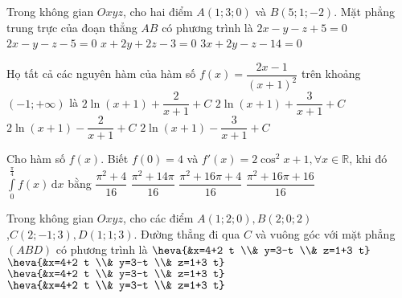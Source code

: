\begin{ex}%
Trong không gian $O x y z$, cho hai điểm $A(1; 3; 0)$ và $B(5; 1;-2)$.
Mặt phẳng trung trực của đoạn thẳng $AB$ có phương trình là
\choice
{$2 x-y-z+5=0$}
{\True $2 x-y-z-5=0$}
{$x+2 y+2 z-3=0$}
{$3 x+2 y-z-14=0$}

\end{ex}
\begin{ex}%
Họ tất cả các nguyên hàm của hàm số $f(x)=\dfrac{2 x-1}{(x+1)^2}$ trên khoảng $(-1;+\infty)$ là
\choice
{$2\ln (x+1)+\dfrac{2}{x+1}+C$}
{\True $2\ln (x+1)+\dfrac{3}{x+1}+C$}
{$2\ln (x+1)-\dfrac{2}{x+1}+C$}
{$2\ln (x+1)-\dfrac{3}{x+1}+C$}

\end{ex}
\begin{ex}%
Cho hàm số $f(x)$. Biết $f(0)=4$ và $f'(x)=2\cos ^2 x+1, \forall x \in \mathbb{R}$,
khi đó $\displaystyle\int\limits_0^{\frac{\pi}{4}} f(x)\mathrm{\,d}x$ bằng
\choice
{$\dfrac{\pi^2+4}{16}$}
{$\dfrac{\pi^2+14\pi}{16}$}
{\True $\dfrac{\pi^2+16\pi+4}{16}$}
{$\dfrac{\pi^2+16\pi+16}{16}$}

\end{ex}
\begin{ex}%
Trong không gian $O x y z$, cho các điểm $A(1; 2; 0), B(2; 0; 2)$\\
,$C(2;-1; 3), D(1; 1; 3)$. Đường thẳng đi qua $C$ và vuông góc với mặt phẳng $(ABD)$ có phương trình là
\choice
{$\heva{&x=4+2 t \\& y=3-t \\& z=1+3 t}$}
{$\heva{&x=4+2 t \\& y=3-t \\& z=1+3 t}$}
{\True $\heva{&x=4+2 t \\& y=3-t \\& z=1+3 t}$}
{$\heva{&x=4+2 t \\& y=3-t \\& z=1+3 t}$}

\end{ex}

